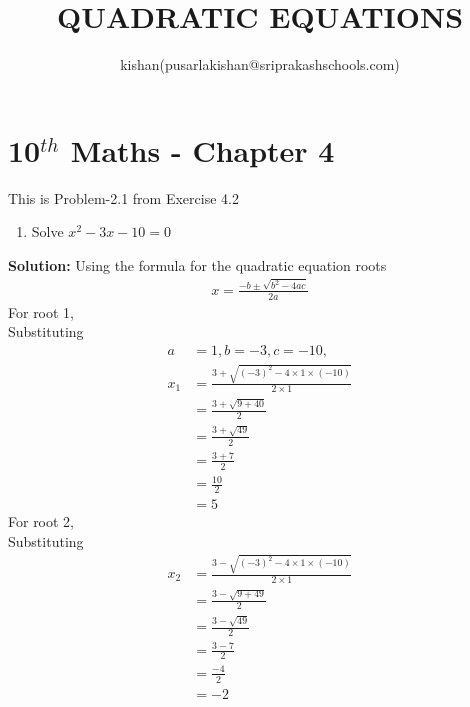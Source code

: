 \documentclass[10pt]{article}
\title{QUADRATIC EQUATIONS}
\author{kishan(pusarlakishan@sriprakashschools.com)}
\newcommand{\solution}{\noindent \textbf{Solution: }}
\begin{document}
    \maketitle
    \section*{10$^{th}$ Maths - Chapter 4}
    This is Problem-2.1 from Exercise 4.2
\begin{enumerate}
    \item Solve $x^2-3x-10=0$
\end{enumerate}
\solution
Using the formula for the quadratic equation roots
\begin{align}
x = \frac{-b \pm \sqrt{b^2-4ac}}{2a}
\end{align}
For root 1,\\
Substituting 
\begin{align}
a &= 1, b = -3, c = -10,
\\
x_1 &= \frac{3+\sqrt{(-3)^2-4\times 1 \times (-10)}}{2\times 1}\\
 &= \frac{3+\sqrt{9+40}}{2}\\
 &= \frac{3+\sqrt{49}}{2}\\
 &= \frac{3+7}{2}\\
 &= \frac{10}{2}\\
 &= 5
\end{align}
For root 2,\\
Substituting\\
\begin{align}
x_2 &= \frac{3-\sqrt{(-3)^2-4\times 1 \times (-10)}}{2\times 1}\\
 &= \frac{3-\sqrt{9+49}}{2}\\
 &= \frac{3-\sqrt{49}}{2}\\
 &= \frac{3-7}{2}\\
 &= \frac{-4}{2}\\
 &=-2
\end{align}
\end{document}
